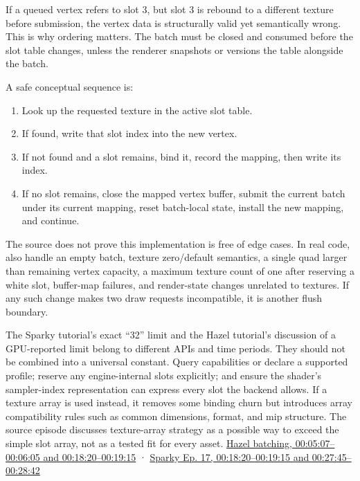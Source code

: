 If a queued vertex refers to slot 3, but slot 3 is rebound to a different texture before submission, the vertex data is structurally valid yet semantically wrong. This is why ordering matters. The batch must be closed and consumed before the slot table changes, unless the renderer snapshots or versions the table alongside the batch.

A safe conceptual sequence is:

\begin{enumerate}
\def\labelenumi{\arabic{enumi}.}
\tightlist
\item
  Look up the requested texture in the active slot table.
\item
  If found, write that slot index into the new vertex.
\item
  If not found and a slot remains, bind it, record the mapping, then write its index.
\item
  If no slot remains, close the mapped vertex buffer, submit the current batch under its current mapping, reset batch-local state, install the new mapping, and continue.
\end{enumerate}

The source does not prove this implementation is free of edge cases. In real code, also handle an empty batch, texture zero/default semantics, a single quad larger than remaining vertex capacity, a maximum texture count of one after reserving a white slot, buffer-map failures, and render-state changes unrelated to textures. If any such change makes two draw requests incompatible, it is another flush boundary.

The Sparky tutorial's exact ``32'' limit and the Hazel tutorial's discussion of a GPU-reported limit belong to different APIs and time periods. They should not be combined into a universal constant. Query capabilities or declare a supported profile; reserve any engine-internal slots explicitly; and ensure the shader's sampler-index representation can express every slot the backend allows. If a texture array is used instead, it removes some binding churn but introduces array compatibility rules such as common dimensions, format, and mip structure. The source episode discusses texture-array strategy as a possible way to exceed the simple slot array, not as a tested fit for every asset. \href{https://www.youtube.com/watch?v=Fz1VySWaad8&t=5m7s}{Hazel batching, 00:05:07--00:06:05 and 00:18:20--00:19:15} · \href{https://www.youtube.com/watch?v=1x4hrdS97cI&t=18m20s}{Sparky Ep. 17, 00:18:20--00:19:15 and 00:27:45--00:28:42}

